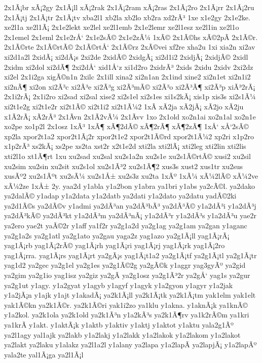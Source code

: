 {2x1Ã¡br
xÃ¡2gy
2x1Ã¡ll
xÃ¡2rak
2x1Ã¡2ram
xÃ¡2ras
2x1Ã¡2ro
2x1Ã¡rr
2x1Ã¡2ru
2x1Ã¡tj
2x1Ã¡tr
2x1Ã¡tv
xba2l1
xb2la
xb2lo
xb2ra
xd2rÃ³
1xe
x1e2gy
2x1e2ke.
xe2l1a
xe2l1Ã¡
2x1e2lekt
xe2lel
xe2l1emb
2x1e2lemr
xe2l1esz
xe2l1in
xe2l1o
2x1emel
2x1eml
2x1e2rÅ‘
2x1e2sÃ©
2x1e2zÃ¼
1xÃ©
2x1Ã©hs
xÃ©2pÃ­
2x1Ã©r.
2x1Ã©rte
2x1Ã©rtÃ©
2x1Ã©rtÅ‘
2x1Ã©rz
2xÃ©vei
xf2re
xha2u
1xi
xia2n
xi2av
xi2d1a2l
2xidÃ¡
xi2dÃ¡s
2xi2de
2xidÃ©
2xidgÃ¡
xi2d1i2
2xidjÃ¡
2xidjÃ©
2xidl
2xidm
xi2dol
xi2dÃ¶
2xi2dÅ‘
xid1Å‘z
xi1d2ro
2xidrÃ³
2xids
2xidu
2xidv
2xi2dz
xi2el
2x1i2ga
xigÃ©n1n
2xilc
2x1ill
xina2
xi2n1an
2x1ind
xine2
xi2n1et
xi2n1i2
xi2nÃ¶
xi2on
xi2Ã³c
xi2Ã³e
xi2Ã³g
xi2Ã³mÃ©
xi2Ã³o
xi2Ã³Ã¶
xi2Ã³p
xiÃ³2rÃ¡
2x1i2rÃ¡
2x1i2ro
xi2sad
xi2sal
xise2
xi2s1el
xi2s1es
xi1s2kÃ¡
xis1p
xis3s
xi2s1Ã¼
xi2t1e2g
xi2t1e2r
xi2t1Ã©
xi2t1i2
xi2t1Ã¼2
1xÃ­
xÃ­2ja
xÃ­2jÃ¡
xÃ­2jo
xÃ­2ju
x1Ã­2rÃ¡
xÃ­2rÃ³
2x1Ã­vn
2x1Ã­2vÃ¼
2x1Ã­vv
1xo
2x1old
xo2n1ai
xo2n1al
xo2n1e
xo2pe
xo1p2l
2x1osz
1xÃ³
1xÃ¶
xÃ¶2dÃ©
xÃ¶2rÃ¶
xÃ¶2zÃ¶
1xÅ‘
xÅ‘2sÃ©
xp2la
xpor2t1a2
xpor2t1Ã¡2r
xpor2t1e2
xpor2t1Ã©rd
xpor2t1Ã¼2
xp2ri
x1p2ro
x1p2rÃ³
xs2kÃ¡
xs2pe
xs2ta
xst2r
x2t1e2d
xti2la
xti2lÃ¡
xti2leg
xti2lin
xti2lis
xti2l1o
xt1Ã¶rt
1xu
xu2sad
xu2sal
xu2s1a2n
xu2s1e
xu2s1Ã©rtÃ©
xusi2
xu2sil
xu2sim
xu2sin
xu2sit
xu2s1ol
xu2s1Ã³2
xu2s1Ã¶2
xus3s
xust2
xus1tr
xu2sus
xusÃº2
xu2s1Ãºt
xu2sÃ¼
xu2s1Å±
xu2s3z
xu2ta
1xÃº
1xÃ¼
xÃ¼2lÃ©
xÃ¼2ve
xÃ¼2ze
1xÅ±
2y.
yaa2d
y1abla
y1a2bon
y1abra
ya1bri
y1abs
ya2cÃ©l.
ya2dako
ya2dalÃ©
y1adap
y1a2data
y1a2datb
ya2dati
y1a2dato
ya2datu
yadÃ©2ki
ya2d1Ã©s
ya2dÃ©v
y1admi
ya2dÃ³an
ya2dÃ³bÃ³
ya2dÃ³Ã©
y1a2dÃ³i
y1a2dÃ³j
ya2dÃ³kÃ©
ya2dÃ³kt
y1a2dÃ³m
ya2dÃ³nÃ¡
y1a2dÃ³r
y1a2dÃ³s
y1a2dÃ³u
yae2r
ya2ero
yae2t
yaÃ©2r
y1aff
ya1f2r
ya2g1a2d
ya2g1ag
ya2g1am
ya2gan
y1aganc
ya2g1a2s
ya2g1atl
ya2g1ato
ya2gau
yaga2z
yag1azo
ya2g1Ã¡ll
yag1Ã¡rÃ¡
yag1Ã¡rb
yag1Ã¡2rÃ©
yag1Ã¡rh
yag1Ã¡ri
yag1Ã¡rj
yag1Ã¡rk
yag1Ã¡2ro
yag1Ã¡rra.
yag1Ã¡rs
yag1Ã¡rt
ya2gÃ¡s
yag1Ã¡t1a2
ya2g1Ã¡tf
ya2g1Ã¡tl
ya2g1Ã¡tr
yag1d2
ya2gec
ya2g1el
ya2g1es
ya2g1Ã©2g
ya2gÃ©k
y1aggr
yag3gyÃº
ya2gid
ya2gim
ya2g1io
yag1isz
ya2giz
ya2gÃ­
ya2g1osz
ya2g1Ã³2r
ya2gÅ‘
yag1s
ya2gur
ya2g1ut
y1agy.
y1a2gyat
y1agyb
y1agyf
y1agyk
y1a2gyon
y1agyr
y1a2jak
y1a2jÃ¡n
y1ajk
y1ajt
y1akadÃ¡
ya2k1Ã¡ll
ya2k1Ã¡tk
ya2k1Ã¡tm
yak1elm
yak1elt
yak1Ã©kn
ya2k1Ã©r.
ya2k1Ã©ri
yak1i2zo
ya1klu
y1akna.
y1aknÃ¡k
ya1knÃ©
y1a2kol.
ya2k1ola
ya2k1old
ya2k1Ã³n
y1a2kÃ³s
ya2k1Ã¶rv
ya1k2rÃ©m
ya1kri
ya1krÃ­
y1akt.
y1aktÃ¡k
y1aktb
y1aktiv
y1aktj
y1aktot
y1aktu
yala2g1Ãº
ya2l1agy
yal1ajk
ya2lakb
y1a2lakj
y1a2lakk
y1a2lakok
y1a2lakom
y1a2lakot
ya2lakt
ya2laku
y1alakz
ya2l1a2l
y1alany
ya2lapa
y1a2lapÃ­
ya2lapjÃ¡
y1a2lapÃº
yala2te
yal1Ã¡ga
ya2l1Ã¡l
}
